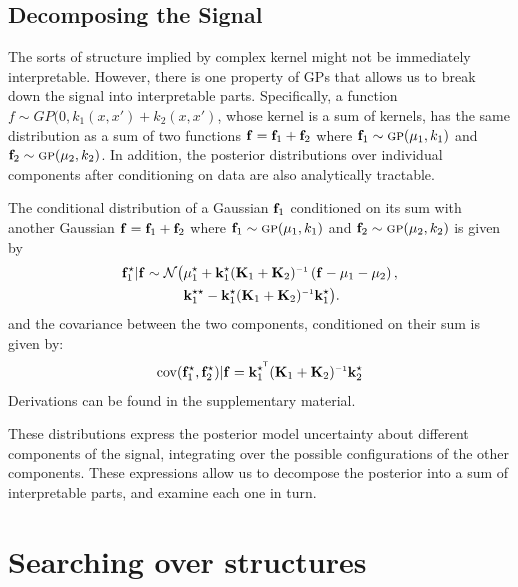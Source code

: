 \documentclass[twoside]{article}
\begin{document}
\subsection{Decomposing the Signal}

The sorts of structure implied by complex kernel might not be immediately interpretable.
However, there is one property of GPs that allows us to break down the signal into interpretable parts.
Specifically, a function $f \sim GP(0, k_1(x, x') + k_2(x,x')$, whose kernel is a sum of kernels, has the same distribution as a sum of two functions ${\bf{f}} = {\bf{f}}_1 + {\bf{f}}_2$ where ${\bf{f}}_1 \sim {\textsc{gp}}( {\bf{\mu}}_1, k_1)$ and ${\bf{f}}_2 \sim {\textsc{gp}}( {\bf{\mu}}_2, k_2)$.
In addition, the posterior distributions over individual components after conditioning on data are also analytically tractable.

The conditional distribution of a Gaussian ${\bf{f}}_1$ conditioned on its sum with another Gaussian ${\bf{f}} = {\bf{f}}_1 + {\bf{f}}_2$ where ${\bf{f}}_1 \sim {\textsc{gp}}( {\bf{\mu}}_1, k_1)$ and ${\bf{f}}_2 \sim {\textsc{gp}}( {\bf{\mu}}_2, k_2)$ is given by
\begin{align}
\vf_1^\star | \vf \sim \mathcal{N} \big( & \vmu_1^\star + \vk_1^\star (\vK_1 + \vK_2)\inv \left( \vf - \vmu_1 - \vmu_2 \right), \nonumber \\
& \vk_1^{\star\star} - \vk_1^\star (\vK_1 + \vK_2)\inv \vk_1^\star \big).
\end{align}
and the covariance between the two components, conditioned on their sum is given by:
\begin{align}
\cov(\vf_1^\star, \vf_2^\star) | \vf = \vk_1^{\star\tra} (\vK_1 + \vK_2)\inv \vk_2^\star
\end{align}
Derivations can be found in the supplementary material.

These distributions express the posterior model uncertainty about different components of the signal, integrating over the possible configurations of the other components.
These expressions allow us to decompose the posterior into a sum of interpretable parts, and examine each one in turn.


\section{Searching over structures}


\end{document}
